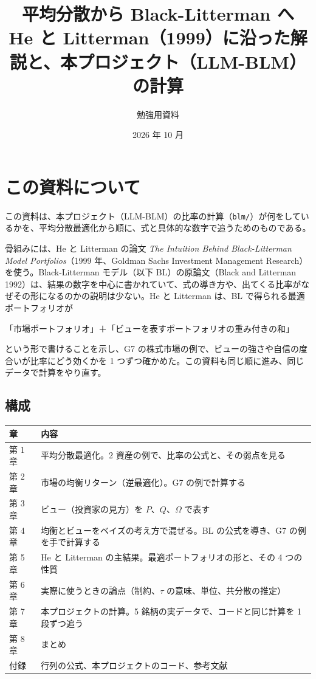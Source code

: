 \documentclass[xelatex,ja=standard,jafont=hiragino-pron,a4paper,11pt,openany]{bxjsreport}
\title{平均分散から Black-Litterman へ\\[6pt]
  \large He と Litterman（1999）に沿った解説と、本プロジェクト（LLM-BLM）の計算}
\author{勉強用資料}
\date{2026 年 10 月}
\newcommand{\code}[1]{\texttt{#1}}
\begin{document}
\maketitle
\setcounter{tocdepth}{1}
{\small\tableofcontents}

\chapter*{この資料について}

この資料は、本プロジェクト（LLM-BLM）の比率の計算（\code{blm/}）が何をしているかを、平均分散最適化から順に、式と具体的な数字で追うためのものである。

骨組みには、He と Litterman の論文 \textit{The Intuition Behind Black-Litterman Model Portfolios}（1999 年、Goldman Sachs Investment Management Research）を使う。Black-Litterman モデル（以下 BL）の原論文（Black and Litterman 1992）は、結果の数字を中心に書かれていて、式の導き方や、出てくる比率がなぜその形になるのかの説明は少ない。He と Litterman は、BL で得られる最適ポートフォリオが
\begin{center}
「市場ポートフォリオ」＋「ビューを表すポートフォリオの重み付きの和」
\end{center}
という形で書けることを示し、G7 の株式市場の例で、ビューの強さや自信の度合いが比率にどう効くかを 1 つずつ確かめた。この資料も同じ順に進み、同じデータで計算をやり直す。

\section*{構成}

\begin{center}
\small
\begin{tabular}{p{2.0cm}p{11.2cm}}
\toprule
章 & 内容 \\
\midrule
第 1 章 & 平均分散最適化。2 資産の例で、比率の公式と、その弱点を見る \\
第 2 章 & 市場の均衡リターン（逆最適化）。G7 の例で計算する \\
第 3 章 & ビュー（投資家の見方）を $P$、$Q$、$\Omega$ で表す \\
第 4 章 & 均衡とビューをベイズの考え方で混ぜる。BL の公式を導き、G7 の例を手で計算する \\
第 5 章 & He と Litterman の主結果。最適ポートフォリオの形と、その 4 つの性質 \\
第 6 章 & 実際に使うときの論点（制約、$\tau$ の意味、単位、共分散の推定） \\
第 7 章 & 本プロジェクトの計算。5 銘柄の実データで、コードと同じ計算を 1 段ずつ追う \\
第 8 章 & まとめ \\
付録 & 行列の公式、本プロジェクトのコード、参考文献 \\
\bottomrule
\end{tabular}
\end{center}
\end{document}
